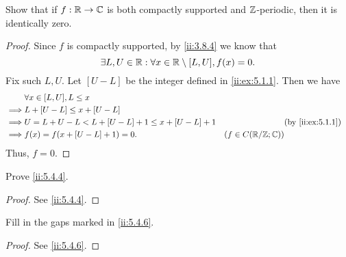 \exercisesection

\begin{ex}\label{ii:ex:5.4.1}
  Show that if \(f : \mathbb{R} \to \mathbb{C}\) is both compactly supported and \(\mathbb{Z}\)-periodic, then it is identically zero.
\end{ex}

\begin{proof}
  Since \(f\) is compactly supported, by \cref{ii:3.8.4} we know that
  \[
    \exists L, U \in \mathbb{R} : \forall x \in \mathbb{R} \setminus [L, U], f(x) = 0.
  \]
  Fix such \(L, U\).
  Let \([U - L]\) be the integer defined in \cref{ii:ex:5.1.1}.
  Then we have
  \begin{align*}
             & \forall x \in [L, U], L \leq x                                                                    \\
    \implies & L + [U - L] \leq x + [U - L]                                                                      \\
    \implies & U = L + U - L < L + [U - L] + 1 \leq x + [U - L] + 1 &                         & \by{ii:ex:5.1.1} \\
    \implies & f(x) = f(x + [U - L] + 1) = 0.                       & (f \in C(\R / \Z ; \C))
  \end{align*}
  Thus, \(f = 0\).
\end{proof}

\begin{ex}\label{ii:ex:5.4.2}
  Prove \cref{ii:5.4.4}.
\end{ex}

\begin{proof}
  See \cref{ii:5.4.4}.
\end{proof}

\begin{ex}\label{ii:ex:5.4.3}
  Fill in the gaps marked in \cref{ii:5.4.6}.
\end{ex}

\begin{proof}
  See \cref{ii:5.4.6}.
\end{proof}
